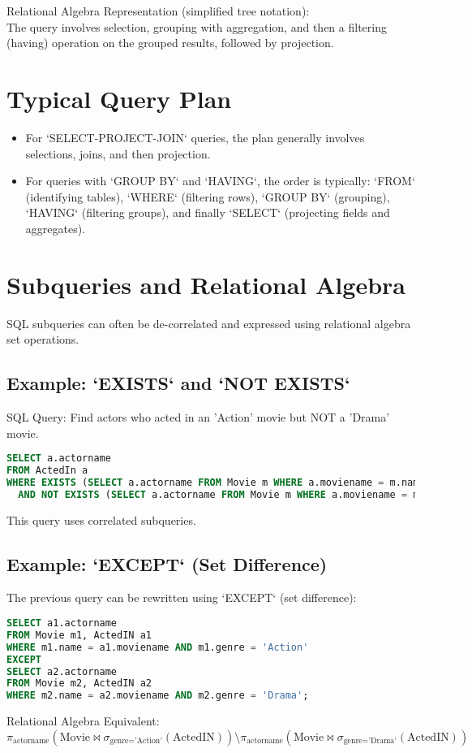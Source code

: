 \documentclass{article}
\newcommand{\sel}{\sigma} %
\newcommand{\proj}{\pi} %
\newcommand{\join}{\bowtie} %
\begin{document}
Relational Algebra Representation (simplified tree notation): \\

The query involves selection, grouping with aggregation, and then a filtering (having) operation on the grouped results, followed by projection. \\

\section*{Typical Query Plan} 
\begin{itemize}
    \item For `SELECT-PROJECT-JOIN` queries, the plan generally involves selections, joins, and then projection. 
    \item For queries with `GROUP BY` and `HAVING`, the order is typically: `FROM` (identifying tables), `WHERE` (filtering rows), `GROUP BY` (grouping), `HAVING` (filtering groups), and finally `SELECT` (projecting fields and aggregates). 
\end{itemize}

\section*{Subqueries and Relational Algebra} 
SQL subqueries can often be de-correlated and expressed using relational algebra set operations.

\subsection*{Example: `EXISTS` and `NOT EXISTS`} 
SQL Query: Find actors who acted in an 'Action' movie but NOT a 'Drama' movie.
\begin{lstlisting}[language=SQL]
SELECT a.actorname
FROM ActedIn a
WHERE EXISTS (SELECT a.actorname FROM Movie m WHERE a.moviename = m.name AND m.genre = 'Action')
  AND NOT EXISTS (SELECT a.actorname FROM Movie m WHERE a.moviename = m.name AND m.genre = 'Drama');
\end{lstlisting}
This query uses correlated subqueries. 

\subsection*{Example: `EXCEPT` (Set Difference)} 
The previous query can be rewritten using `EXCEPT` (set difference): 
\begin{lstlisting}[language=SQL]
SELECT a1.actorname
FROM Movie m1, ActedIN a1
WHERE m1.name = a1.moviename AND m1.genre = 'Action'
EXCEPT
SELECT a2.actorname
FROM Movie m2, ActedIN a2
WHERE m2.name = a2.moviename AND m2.genre = 'Drama';
\end{lstlisting}
Relational Algebra Equivalent: 
$\proj_{\text{actorname}}(\text{Movie} \join \sel_{\text{genre='Action'}}(\text{ActedIN})) \setminus \proj_{\text{actorname}}(\text{Movie} \join \sel_{\text{genre='Drama'}}(\text{ActedIN}))$
\end{document}
